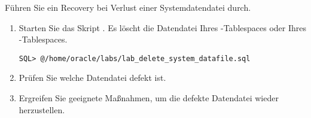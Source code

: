     \item F\"uhren Sie ein Recovery bei Verlust einer Systemdatendatei durch.
      \begin{enumerate}
        \item Starten Sie das Skript . Es l\"oscht die Datendatei Ihres -Tablespaces oder Ihres -Tablespaces.
          \begin{lstlisting}[language=terminal]
SQL> @/home/oracle/labs/lab_delete_system_datafile.sql
          \end{lstlisting}
        \item Pr\"ufen Sie welche Datendatei defekt ist.
        \item Ergreifen Sie geeignete Ma\ss{}nahmen, um die defekte Datendatei wieder herzustellen.
      \end{enumerate}